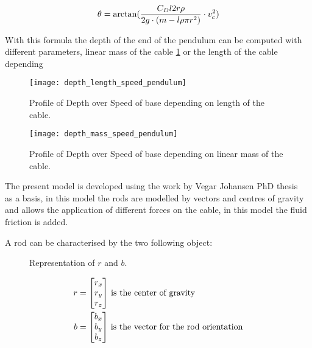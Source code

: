 \begin{equation}
 \theta = \arctan(\frac{C_D l 2 r \rho}{2 g \cdot (m - l \rho \pi r^2)} \cdot v_c^2)\\
 \label{equ_theta_1}
 \end{equation}
 
With this formula the depth of the end of the pendulum can be computed with different parameters, linear mass of the cable \ref{fig:depth_mass_speed_pendulum} or the length of the cable depending 
 
 \begin{figure}[H]
\centering
    \begin{minipage}[b]{0.4\textwidth}
    \centering
    \texttt{[image: depth\_length\_speed\_pendulum]}
    \caption{Profile of Depth over Speed of base depending on length of the cable.}
    \label{fig:depth_length_speed_pendulum}
    \end{minipage}
    \hfill
    \begin{minipage}[b]{0.4\textwidth}
    \centering
    \texttt{[image: depth\_mass\_speed\_pendulum]}
    \caption{Profile of Depth over Speed of base depending on linear mass of the cable.}
    \label{fig:depth_mass_speed_pendulum}
    \end{minipage}
\end{figure}

The present model is developed using the work by Vegar Johansen PhD thesis~\cite{johansen2007modelling} as a basis, in this model the rods are modelled by vectors and centres of gravity and allows the application of different forces on the cable, in this model the fluid friction is added.

A rod can be characterised by the two following object:

\begin{figure}[H]
\centering
{} %
{

}
\caption{Representation of $r$ and $b$.}
\label{fig:draw_ref_rb}
\end{figure}

\begin{align}
r &= \begin{bmatrix}
    r_x \\
    r_y \\
    r_z
\end{bmatrix}\, \textnormal{is the center of gravity}\\
b &= \begin{bmatrix}
    b_x \\
    b_y \\
    b_z
\end{bmatrix}\, \textnormal{is the vector for the rod orientation}
\end{align}

